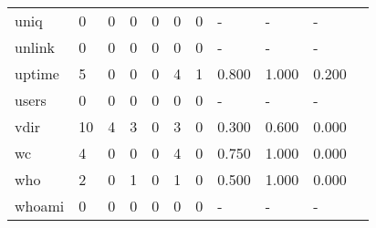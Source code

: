 \begin{longtable}{lp{1.10cm}p{1.10cm}p{1.10cm}p{1.10cm}p{1.10cm}p{1.10cm}p{1.10cm}p{1.10cm}p{1.10cm}p{1.10cm}}
uniq      &                      0 &                                  0 &                                 0 &                                0 &                                 0 &                               0 &                              - &                                     - &                                   - \\
unlink    &                      0 &                                  0 &                                 0 &                                0 &                                 0 &                               0 &                              - &                                     - &                                   - \\
uptime    &                      5 &                                  0 &                                 0 &                                0 &                                 4 &                               1 &                          0.800 &                                 1.000 &                               0.200 \\
users     &                      0 &                                  0 &                                 0 &                                0 &                                 0 &                               0 &                              - &                                     - &                                   - \\
vdir      &                     10 &                                  4 &                                 3 &                                0 &                                 3 &                               0 &                          0.300 &                                 0.600 &                               0.000 \\
wc        &                      4 &                                  0 &                                 0 &                                0 &                                 4 &                               0 &                          0.750 &                                 1.000 &                               0.000 \\
who       &                      2 &                                  0 &                                 1 &                                0 &                                 1 &                               0 &                          0.500 &                                 1.000 &                               0.000 \\
whoami    &                      0 &                                  0 &                                 0 &                                0 &                                 0 &                               0 &                              - &                                     - &                                   - \\

\end{longtable}
